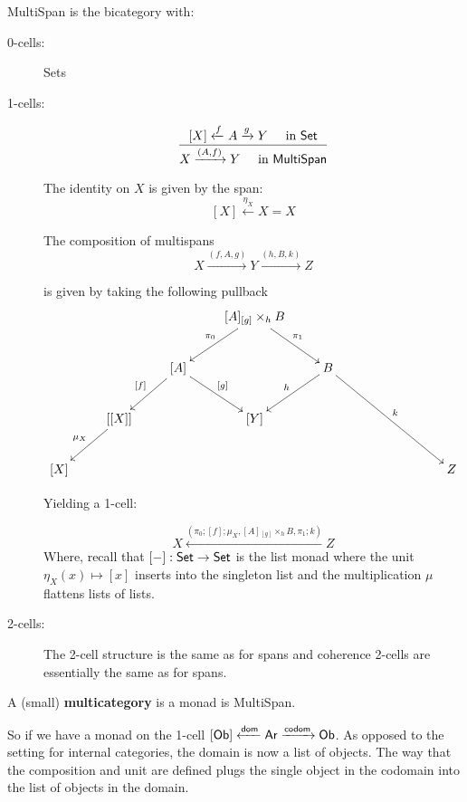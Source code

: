 \begin{definition}
{\sf MultiSpan} is the bicategory with:

\begin{description}
\item[0-cells:] Sets
\item[1-cells:] 

$$
\dfrac{[X] \xleftarrow{f} A \xrightarrow{g} Y \hspace*{.5cm}\text{in $\mathsf{Set}$}}
{X \xrightarrow{(A,f)} Y  \hspace*{.5cm}\text{in {\sf MultiSpan}}}
$$

The identity on $X$ is given by the span:
$$ [X] \xleftarrow{\eta_X } X = X$$


The composition of multispans
$$X \xrightarrow{(f,A,g)} Y\xrightarrow{(h,B,k)} Z $$

is given by taking the following pullback
$$
\xymatrix{
     &         &      &[A] {}_{[g]}\times_h B \ar[dr]^{\pi_1} \ar[dl]_{\pi_0} \\
     &         &[A] \ar[dr]^{[g]} \ar[dl]_{[f]}&      & B \ar[dl]_h \ar[ddrrr]^k &   & \\
     & [[X]] \ar[dl]_{\mu_X} &      &[Y] &    &    &  \\
[X] &         &      &     &    &    &&Z
}
$$

Yielding a 1-cell:

$$
X\xleftarrow{(\pi_0;[f];\mu_X, [A] {}_{[g]}\times_h B, \pi_1;k)} Z
$$
Where, recall that $[-]:\mathsf{Set}\to\mathsf{Set} $ is the list monad where the unit $\eta_X(x)\mapsto [x]$ inserts into the singleton list  and the multiplication $\mu$ flattens lists of lists.

\item[2-cells:] The 2-cell structure is the same as for spans and coherence 2-cells are essentially the same as for spans.

\end{description}
\end{definition}


\begin{definition}
A (small) {\bf multicategory} is a monad is {\sf MultiSpan}.
\end{definition}

So if we have a monad on the 1-cell $[ {\sf Ob}] \xleftarrow{\sf dom} {\sf Ar} \xrightarrow{\sf codom} {\sf Ob}$.  As opposed to the setting for internal categories, the domain is now a list of objects.  The way that the composition and unit are defined plugs the single object in the codomain into the list of objects in the domain.


